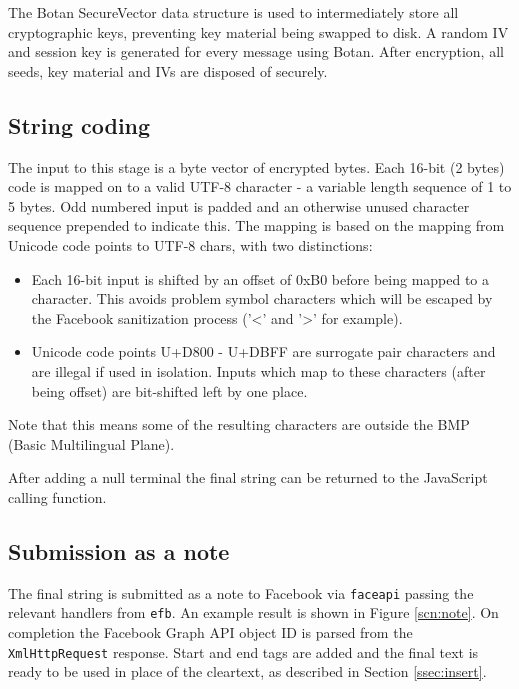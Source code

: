 The Botan SecureVector data structure is used to intermediately store all cryptographic keys, preventing key material being swapped to disk. A random IV and session key is generated for every message using Botan. After encryption, all seeds, key material and IVs are disposed of securely.


\FloatBarrier
\subsection{String coding}
\label{ssec:utf8}

The input to this stage is a byte vector of encrypted bytes. Each 16-bit (2 bytes) code is mapped on to a valid UTF-8 character - a variable length sequence of 1 to 5 bytes. Odd numbered input is padded and an otherwise unused character sequence prepended to indicate this. The mapping is based on the mapping from Unicode code points to UTF-8 chars, with two distinctions:

\begin{itemize}

    \item Each 16-bit input is shifted by an offset of 0xB0 before being mapped to a character. This avoids problem symbol characters which will be escaped by the Facebook sanitization process ('<' and '>' for example).
    
    \item Unicode code points U+D800 - U+DBFF are surrogate pair characters and are illegal if used in isolation. Inputs which map to these characters (after being offset) are bit-shifted left by one place.
    
\end{itemize}


Note that this means some of the resulting characters are outside the BMP (Basic Multilingual Plane).

After adding a null terminal the final string can be returned to the JavaScript calling function.


\FloatBarrier
\subsection{Submission as a note}
\label{ssec:submitnote}

The final string is submitted as a note to Facebook via {\tt faceapi} passing the relevant handlers from {\tt efb}. An example result is shown in Figure \ref{scn:note}. On completion the Facebook Graph API object ID is parsed from the {\tt XmlHttpRequest} response.  Start and end tags are added and the final text is ready to be used in place of the cleartext, as described in Section \ref{ssec:insert}.


